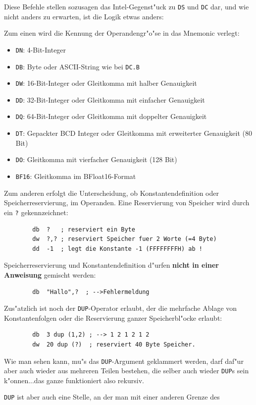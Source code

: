 \documentclass[12pt,a4paper,twoside]{report}
\makeatletter
\newcommand{\bb}[1]{{\bf #1}}
\newcommand{\tty}[1]{{\tt #1}}
\newcommand{\ttindex}[1]{\index{#1@{\tt #1}}}
\makeatother
\begin{document}
Diese Befehle stellen sozusagen das Intel-Gegenst"uck zu \tty{DS}
und \tty{DC} dar, und wie nicht anders zu erwarten, ist die Logik
etwas anders:
\par
Zum einen wird die Kennung der Operandengr"o"se in das Mnemonic
verlegt:
\begin{itemize}
\item{\tty{DN}: 4-Bit-Integer}
\item{\tty{DB}: Byte oder ASCII-String wie bei \tty{DC.B}}
\item{\tty{DW}: 16-Bit-Integer oder Gleitkomma mit halber Genauigkeit}
\item{\tty{DD}: 32-Bit-Integer oder Gleitkomma mit einfacher Genauigkeit}
\item{\tty{DQ}: 64-Bit-Integer oder Gleitkomma mit doppelter Genauigkeit}
\item{\tty{DT}: Gepackter BCD Integer oder Gleitkomma mit erweiterter Genauigkeit (80 Bit)}
\item{\tty{DO}: Gleitkomma mit vierfacher Genauigkeit (128 Bit)}
\item{\tty{BF16}: Gleitkomma im BFloat16-Format}
\end{itemize}
Zum anderen erfolgt die Unterscheidung, ob Konstantendefinition oder
Speicherreservierung, im Operanden.  Eine Reservierung von Speicher
wird durch ein \tty{?} gekennzeichnet:
\begin{verbatim}
        db  ?   ; reserviert ein Byte
        dw  ?,? ; reserviert Speicher fuer 2 Worte (=4 Byte)
        dd  -1  ; legt die Konstante -1 (FFFFFFFFH) ab !
\end{verbatim}
Speicherreservierung und Konstantendefinition d"urfen \bb{nicht in einer
Anweisung} gemischt werden:
\begin{verbatim}
        db  "Hallo",?  ; -->Fehlermeldung
\end{verbatim}
\ttindex{DUP}
Zus"atzlich ist noch der \tty{DUP}-Operator erlaubt, der die mehrfache Ablage
von Konstantenfolgen oder die Reservierung ganzer Speicherbl"ocke erlaubt:
\begin{verbatim}
        db  3 dup (1,2) ; --> 1 2 1 2 1 2
        dw  20 dup (?)  ; reserviert 40 Byte Speicher.
\end{verbatim}
Wie man sehen kann, mu"s das \tty{DUP}-Argument geklammert werden, darf daf"ur
aber auch wieder aus mehreren Teilen bestehen, die selber auch wieder
\tty{DUP}s sein k"onnen...das ganze funktioniert also rekursiv.
\par
\tty{DUP} ist aber auch eine Stelle, an der man mit einer anderen Grenze des
\end{document}
